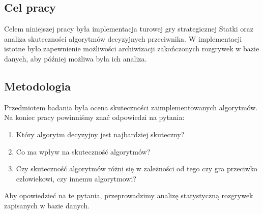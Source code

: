 \subsection{Cel pracy}
\indent Celem niniejszej pracy była implementacja turowej gry strategicznej Statki oraz analiza skuteczności algorytmów decyzyjnych przeciwnika. W implementacji istotne było zapewnienie możliwości archiwizacji zakończonych rozgrywek w bazie danych, aby później możliwa była ich analiza.

\subsection{Metodologia}
\indent Przedmiotem badania była ocena skuteczności zaimplementowanych algorytmów. Na koniec pracy powinniśmy znać odpowiedzi na pytania:
\begin{enumerate}
  \item Który algorytm decyzyjny jest najbardziej skuteczny?
  \item Co ma wpływ na skuteczność algorytmów?
  \item Czy skuteczność algorytmów różni się w zależności od tego czy gra przeciwko człowiekowi, czy innemu algorytmowi?
\end{enumerate}
Aby opowiedzieć na te pytania, przeprowadzimy analizę statystyczną rozgrywek zapisanych w bazie danych.